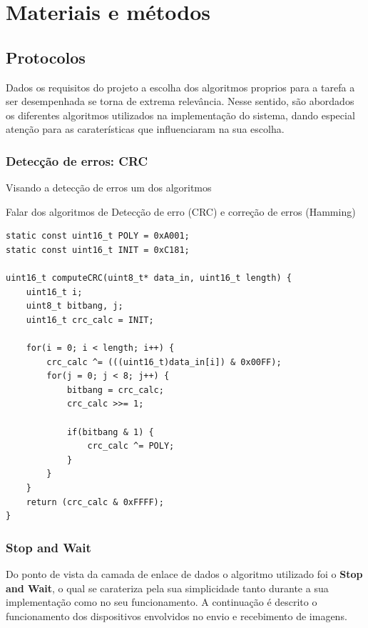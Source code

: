 \documentclass[
article,			%
12pt,				%
oneside,			%
a4paper,			%
english,			%
brazil,				%
sumario=tradicional
]{abntex2}
\begin{document}
\cleardoublepage

\section{Materiais e métodos}\label{Materiais e métodos}

\subsection{Protocolos}\label{Protocolos}

Dados os requisitos do projeto a escolha dos algoritmos proprios para a tarefa a ser desempenhada se torna de extrema relevância. Nesse sentido, são abordados os diferentes algoritmos utilizados na implementação do sistema, dando especial atenção para as caraterísticas que influenciaram na sua escolha.

\subsubsection{Detecção de erros: CRC}\label{CRC}

Visando a detecção de erros um dos algoritmos 

Falar dos algoritmos de Detecção de erro (CRC) e correção de erros (Hamming)

\begin{lstlisting}[title=Algoritmo CRC 16 bits]
static const uint16_t POLY = 0xA001;
static const uint16_t INIT = 0xC181;

uint16_t computeCRC(uint8_t* data_in, uint16_t length) {
    uint16_t i;
    uint8_t bitbang, j;
    uint16_t crc_calc = INIT;

    for(i = 0; i < length; i++) {
        crc_calc ^= (((uint16_t)data_in[i]) & 0x00FF);
        for(j = 0; j < 8; j++) {
            bitbang = crc_calc;
            crc_calc >>= 1;

            if(bitbang & 1) {
                crc_calc ^= POLY;
            }
        }
    }
    return (crc_calc & 0xFFFF);
}
\end{lstlisting}

\subsubsection{Stop and Wait}\label{Stop and Wait}

Do ponto de vista da camada de enlace de dados o algoritmo utilizado foi o \textbf{Stop and Wait}, o qual se carateriza pela sua simplicidade tanto durante a sua implementação como no seu funcionamento. A continuação é descrito o funcionamento dos dispositivos envolvidos no envio e recebimento de imagens.
\end{document}
